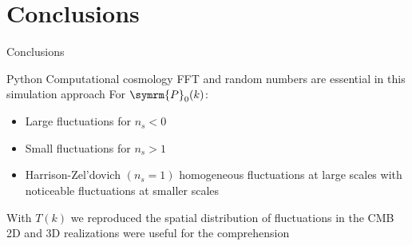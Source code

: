 \section{Conclusions}
\begin{frame}[noframenumbering]{Conclusions}
    \begin{itemize}
        \thusitem Python  Computational cosmology
        \thusitem FFT and random numbers are essential in this simulation approach
        \thusitem For \(\symrm{P}_0(k)\):
        \begin{itemize}[label=\filledcircle]
            \item Large fluctuations for \(n_s<0\)
            \item Small fluctuations for \(n_s>1\)
            \item Harrison-Zel'dovich \((n_s=1)\) homogeneous fluctuations at large scales with noticeable fluctuations at smaller scales
        \end{itemize}
        \thusitem With \(T(k)\) we reproduced the spatial distribution of fluctuations in the CMB
        \thusitem 2D and 3D realizations were useful for the comprehension
    \end{itemize}
\end{frame}